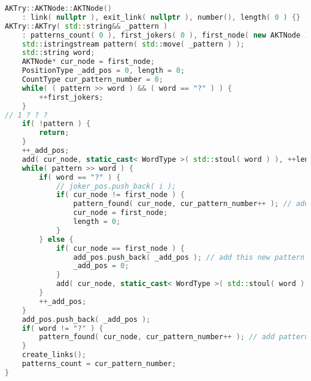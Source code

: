 \begin{lstlisting}[language=C++]
AKTry::AKTNode::AKTNode()
    : link( nullptr ), exit_link( nullptr ), number(), length( 0 ) {}
AKTry::AKTry( std::string&& _pattern )
    : patterns_count( 0 ), first_jokers( 0 ), first_node( new AKTNode ) {
    std::istringstream pattern( std::move( _pattern ) );
    std::string word;
    AKTNode* cur_node = first_node;
    PositionType _add_pos = 0, length = 0;
    CountType cur_pattern_number = 0;
    while( ( pattern >> word ) && ( word == "?" ) ) {
        ++first_jokers;
    }
// 1 ? ? ?
    if( !pattern ) {
        return;
    }
    ++_add_pos;
    add( cur_node, static_cast< WordType >( std::stoul( word ) ), ++length );
    while( pattern >> word ) {
        if( word == "?" ) {
            // joker_pos.push_back( i );
            if( cur_node != first_node ) {
                pattern_found( cur_node, cur_pattern_number++ ); // add pattern_number here
                cur_node = first_node;
                length = 0;
            }
        } else {
            if( cur_node == first_node ) {
                add_pos.push_back( _add_pos ); // add this new pattern
                _add_pos = 0;
            }
            add( cur_node, static_cast< WordType >( std::stoul( word ) ), ++length );
        }
        ++_add_pos;
    }
    add_pos.push_back( _add_pos );
    if( word != "?" ) {
        pattern_found( cur_node, cur_pattern_number++ ); // add pattern_number here
    }
    create_links();
    patterns_count = cur_pattern_number;
}


\end{lstlisting}
